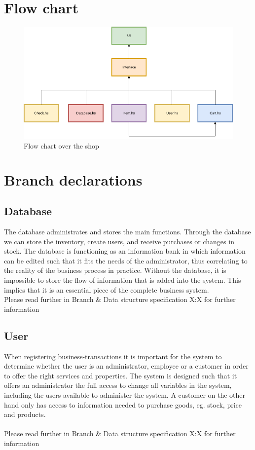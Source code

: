 \documentclass[11pt]{article}
\begin{document}
\section{Flow chart}
\begin{figure}[h]
\includegraphics[width=\linewidth]{FlowChart.png}
\caption{Flow chart over the shop}
\label{fig:flow chart}
\end{figure}
\section{Branch declarations}
\subsection{Database}
The database administrates and stores the main functions. Through the database we can store the inventory, create users, and receive purchases or changes in stock.
The database is functioning as an information bank in which information can be edited such that it fits the needs of the administrator, thus correlating to the reality of the business process in practice. Without the database, it is impossible to store the flow of information that is added into the system. This implies that it is an essential piece of the complete business system.
\\
Please read further in Branch \& Data structure specification X:X for further information
\pagebreak
\subsection{User}
When registering business-transactions it is important for the system to determine whether the user is an administrator, employee or a customer in order to offer the right services and properties.
The system is designed such that it offers an administrator the full access to change all variables in the system, including the users available to administer the system.
A customer on the other hand only has access to information needed to purchase goods, eg. stock, price and products.
\\\\
Please read further in Branch \& Data structure specification X:X for further information
\end{document}

